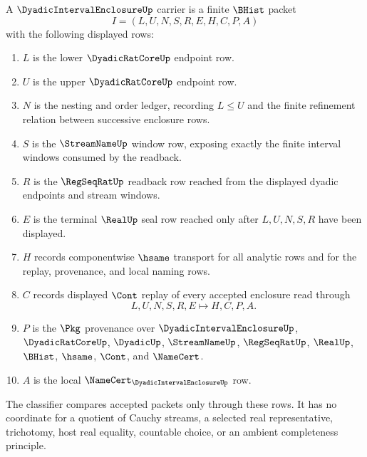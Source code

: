 \begin{definition}
\label{def:dyadic-interval-enclosure-carrier}
A $\DyadicIntervalEnclosureUp$ carrier is a finite $\BHist$ packet
$$
I=(L,U,N,S,R,E,H,C,P,A)
$$
with the following displayed rows:
\begin{enumerate}
\item $L$ is the lower $\DyadicRatCoreUp$ endpoint row.
\item $U$ is the upper $\DyadicRatCoreUp$ endpoint row.
\item $N$ is the nesting and order ledger, recording $L \leq U$ and the finite refinement relation between successive enclosure rows.
\item $S$ is the $\StreamNameUp$ window row, exposing exactly the finite interval windows consumed by the readback.
\item $R$ is the $\RegSeqRatUp$ readback row reached from the displayed dyadic endpoints and stream windows.
\item $E$ is the terminal $\RealUp$ seal row reached only after $L,U,N,S,R$ have been displayed.
\item $H$ records componentwise $\hsame$ transport for all analytic rows and for the replay, provenance, and local naming rows.
\item $C$ records displayed $\Cont$ replay of every accepted enclosure read through
$$
L,U,N,S,R,E \longmapsto H,C,P,A .
$$
\item $P$ is the $\Pkg$ provenance over $\DyadicIntervalEnclosureUp$, $\DyadicRatCoreUp$, $\DyadicUp$, $\StreamNameUp$, $\RegSeqRatUp$, $\RealUp$, $\BHist$, $\hsame$, $\Cont$, and $\NameCert$.
\item $A$ is the local $\NameCert_{\DyadicIntervalEnclosureUp}$ row.
\end{enumerate}
The classifier compares accepted packets only through these rows. It has no coordinate for a quotient of Cauchy streams, a selected real representative, trichotomy, host real equality, countable choice, or an ambient completeness principle.
\end{definition}

